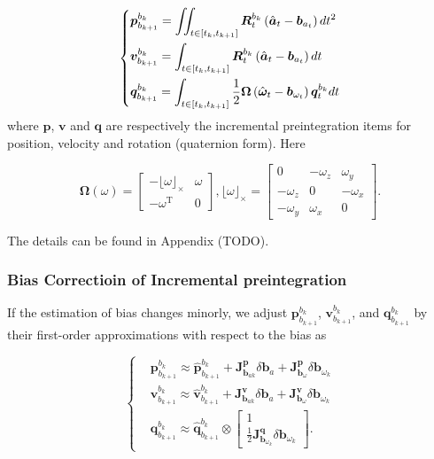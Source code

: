 \documentclass[12pt]{article}   %
\begin{document}
\begin{equation}
\centering
\left\{
\begin{aligned}
&\bm{p}_{b_{k+1}}^{b_k}=\iint_{t\in\left[t_k,t_{k+1}\right]}\bm{R}_{t}^{b_k}\left(\hat{\bm{a}}_{t}-\bm{b}_{a_t}\right)dt^2\\
&\bm{v}_{b_{k+1}}^{b_k}=\int_{t\in\left[t_k,t_{k+1}\right]}\bm{R}_{t}^{b_k}\left(\hat{\bm{a}}_{t}-\bm{b}_{a_t}\right)dt \\
&\bm{q}_{b_{k+1}}^{b_k}=\int_{t\in\left[t_k,t_{k+1}\right]}\frac{1}{2}\bm{\Omega}\left(\hat{\bm{\omega}}_t-\bm{b}_{\omega_t}\right)\bm{q}_t^{b_k}dt
\end{aligned}
\right.
\label{eq.preintegration}
\end{equation}
where $\bm{p}$, $\bm{v}$ and $\bm{q}$ are respectively the
incremental preintegration items for position, velocity and rotation (quaternion
form). Here 

\begin{equation}
\bm{\Omega}\left( \omega \right) = 
\begin{bmatrix}
	- \lfloor \omega \rfloor _ \times & \omega \\
	- \omega ^{\mathrm{T}} & 0
\end{bmatrix}, \lfloor \omega \rfloor _ \times = 
\begin{bmatrix}
	0 & - \omega_z & \omega_y \\
	- \omega_z & 0 & - \omega_x \\
	- \omega_y & \omega_x & 0
\end{bmatrix}.
\label{eq.rot_incremental}
\end{equation}

The details can be found in Appendix (TODO).


\subsubsection{Bias Correctioin of Incremental preintegration}

If the estimation of bias changes minorly, we adjust $\bm{p}_{b_{k+1}}^{b_k}$, $\bm{v}_{b_{k+1}}^{b_k}$, and $\bm{q}_{b_{k+1}}^{b_k}$ by their first-order approximations with respect to the bias as

\begin{equation}
\left\{
\begin{aligned}
&\bm{p}_{b_{k+1}}^{b_k}\approx\hat{\bm{p}}_{b_{k+1}}^{b_k}+\bm{J}^{\bm{p}}_{\bm{b}_{ak}}\delta\bm{b}_a+\bm{J}^{\bm{p}}_{\bm{b}_\omega}\delta\bm{b}_{\omega_k} \\
&\bm{v}_{b_{k+1}}^{b_k}\approx\hat{\bm{v}}_{b_{k+1}}^{b_k}+\bm{J}^{\bm{v}}_{\bm{b}_{ak}}\delta\bm{b}_a+\bm{J}^{\bm{v}}_{\bm{b}_\omega}\delta\bm{b}_{\omega_k} \\
&\bm{q}_{b_{k+1}}^{b_k}\approx\hat{\bm{q}}_{b_{k+1}}^{b_k}\otimes 
	\begin{bmatrix}
		1 \\ \frac{1}{2}\bm{J}^{\bm{q}}_{\bm{b}_{\omega_k}}\delta\bm{b}_{\omega_k}
	\end{bmatrix}.
\end{aligned}
\right.
\label{eq.bias_correction}
\end{equation}
\end{document}
